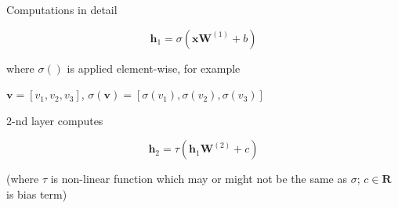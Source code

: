 \documentclass[12pt]{beamer}
\begin{document}
%
%
%
%
%
%
%
%
%


\begin{frame}{Computations in detail}


$$
\mathbf{h}_1 = \sigma(\mathbf{x} \mathbf{W}^{(1)} + b)
$$
	
	where $\sigma()$ is applied element-wise, for example

	 $\mathbf{v} = [v_1, v_2, v_3]$, $\sigma(\mathbf{v}) = [\sigma(v_1), \sigma(v_2), \sigma(v_3)]$
	 
2-nd layer computes

$$
\mathbf{h}_2 = \tau(\mathbf{h}_1 \mathbf{W}^{(2)} + c)
$$

(where $\tau$ is non-linear function which may or might not be the same as $\sigma$; $c \in \mathbf{R}$ is bias term)
	
\end{frame}
\end{document}
